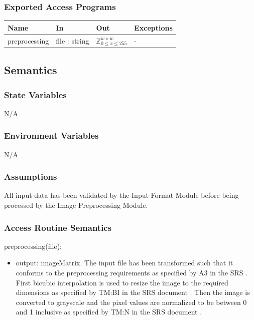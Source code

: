 \documentclass[12pt, titlepage]{article}
\begin{document}
\subsubsection{Exported Access Programs}

\begin{center}
\begin{tabular}{p{3cm} p{3cm} p{4cm} p{2cm}}
\hline
\textbf{Name} & \textbf{In} & \textbf{Out} & \textbf{Exceptions} \\
\hline
preprocessing & file : string & $\mathbb{Z}^{w \times w}_{0 \le x \le 255}$ & - \\
\hline
\end{tabular}
\end{center}

\subsection{Semantics}

\subsubsection{State Variables}

N/A

\subsubsection{Environment Variables}

N/A

\subsubsection{Assumptions}

All input data has been validated by the Input Format Module before being
processed by the Image Preprocessing Module.

\subsubsection{Access Routine Semantics}

\noindent preprocessing(file):
\begin{itemize} 
\item output: imageMatrix. The input file has been transformed such that it
conforms to the preprocessing requirements as specified by A3 in the SRS
\citep[4.2.1]{SRS}. First bicubic interpolation is used to resize the image to
the required dimensions as specified by TM:BI in the SRS document \citep[4.2.2]{SRS}.
Then the image is converted to grayscale and the pixel values are normalized to be
between 0 and 1 inclusive as specified by TM:N in the SRS document \citep[4.2.2]{SRS}.
\end{itemize}
\end{document}
